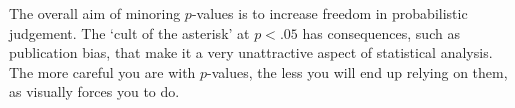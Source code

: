 	The overall aim of minoring $p$-values is to increase freedom in probabilistic judgement. The `cult of the asterisk' at $p < .05$ has consequences, such as publication bias, that make it a very unattractive aspect of statistical analysis. The more careful you are with $p$-values, the less you will end up relying on them, as  visually forces you to do.